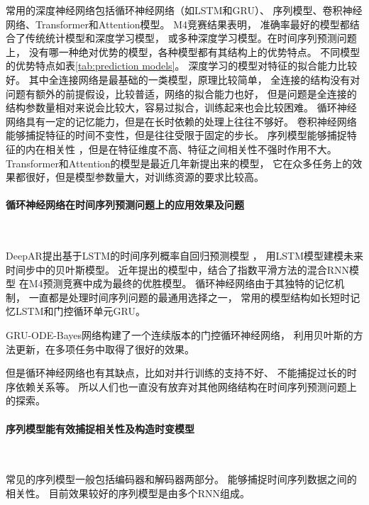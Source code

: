   常用的深度神经网络包括循环神经网络（如LSTM和GRU）、
  序列模型、卷积神经网络、Transformer和Attention模型。
  M4竞赛结果表明\cite{MAKRIDAKIS202054}，
  准确率最好的模型都结合了传统统计模型和深度学习模型，
  或多种深度学习模型。在时间序列预测问题上，
  没有哪一种绝对优势的模型，各种模型都有其结构上的优势特点。
  不同模型的优势特点如表\ref{tab:prediction models}。
  深度学习的模型对特征的拟合能力比较好。
  其中全连接网络是最基础的一类模型，原理比较简单，
  全连接的结构没有对问题有额外的前提假设，比较普适，网络的拟合能力也好，
  但是问题是全连接的结构参数量相对来说会比较大，容易过拟合，训练起来也会比较困难。
  循环神经网络具有一定的记忆能力，但是在长时依赖的处理上往往不够好。
  卷积神经网络能够捕捉特征的时间不变性，但是往往受限于固定的步长。
  序列模型能够捕捉特征的内在相关性 ，但是在特征维度不高、特征之间相关性不强时作用不大。
  Transformer和Attention的模型是最近几年新提出来的模型，
  它在众多任务上的效果都很好，但是模型参数量大，对训练资源的要求比较高。

  \paragraph{循环神经网络在时间序列预测问题上的应用效果及问题}~{}

    DeepAR提出基于LSTM的时间序列概率自回归预测模型
    \cite{salinas2020deepar}，
    用LSTM模型建模未来时间步中的贝叶斯模型。
    近年提出的模型中，结合了指数平滑方法的混合RNN模型\cite{smyl2020hybrid}
    在M4预测竞赛中成为最终的优胜模型\cite{MAKRIDAKIS202054}。
    循环神经网络由于其独特的记忆机制\cite{hewamalage2021recurrent}，
    一直都是处理时间序列问题的最通用选择之一，
    常用的模型结构如长短时记忆LSTM和门控循环单元GRU。

    GRU-ODE-Bayes网络\cite{de2019gru}构建了一个连续版本的门控循环神经网络，
    利用贝叶斯的方法更新，在多项任务中取得了很好的效果。

    但是循环神经网络也有其缺点，比如对并行训练的支持不好、
    不能捕捉过长的时序依赖关系等。
    所以人们也一直没有放弃对其他网络结构在时间序列预测问题上的探索。

  \paragraph{序列模型能有效捕捉相关性及构造时变模型}~{}

    常见的序列模型一般包括编码器和解码器两部分。
    能够捕捉时间序列数据之间的相关性。
    目前效果较好的序列模型是由多个RNN组成。

